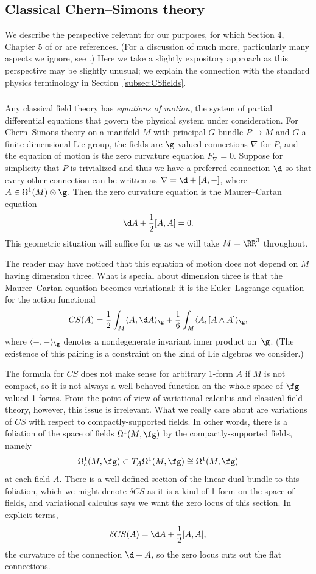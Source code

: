 \documentclass[10pt]{amsart}
\begin{document}
\subsection{Classical Chern--Simons theory}

We describe the perspective relevant for our purposes,
for which Section 4, Chapter 5 of \cite{CosBook} or \cite{CosCS} are references.
(For a discussion of much more, particularly many aspects we ignore, see \cite{FreCCS}.)
Here we take a slightly expository approach as this perspective may be slightly unusual;
we explain the connection with the standard physics terminology in Section~\ref{subsec:CSfields}.

\subsubsection{}

Any classical field theory has {\em equations of motion}, 
the system of partial differential equations that govern the physical system under consideration.
For Chern--Simons theory on a manifold $M$ with principal $G$-bundle $P \to M$ 
and $G$ a finite-dimensional Lie group,
the fields are $\g$-valued connections $\nabla$ for $P$,
and the equation of motion is the zero curvature equation $F_\nabla = 0$.
Suppose for simplicity that $P$ is trivialized 
and thus we have a preferred connection $\d$
so that every other connection can be written as $\nabla = \d + [A, -]$,
where $A \in \Omega^1(M) \otimes \g$.
Then the zero curvature equation is the Maurer--Cartan equation 
\[
\d A + \frac{1}{2} [A,A] = 0.
\]
This geometric situation will suffice for us as we will take $M = \RR^3$ throughout.

The reader may have noticed that this equation of motion does not depend on $M$ having dimension three.
What is special about dimension three is that the Maurer--Cartan equation becomes variational:
it is the  Euler--Lagrange equation for the action functional
\[
CS(A) = \frac{1}{2} \int_M \langle A, \d A \rangle_\g + \frac{1}{6} \int_M \langle A, [A \wedge A] \rangle_\g,
\]
where $\langle-,-\rangle_\g$ denotes a nondegenerate invariant inner product on~$\g$.
(The existence of this pairing is a constraint on the kind of Lie algebras we consider.)

The formula for $CS$ does not make sense for arbitrary 1-form $A$ if $M$ is not compact, 
so it is not always a well-behaved function on the whole space of $\fg$-valued 1-forms.
From the point of view of variational calculus and classical field theory, however, this issue is irrelevant.
What we really care about are variations of $CS$ with respect to compactly-supported fields.
In other words, there is a foliation of the space of fields $\Omega^1(M,\fg)$ by the compactly-supported fields,
namely 
\[
\Omega^1_c(M,\fg) \subset T_{A} \Omega^1(M,\fg) \cong \Omega^1(M,\fg)
\]
at each field $A$. 
There is a well-defined section of the linear dual bundle to this foliation, 
which we might denote $\delta CS$ as it is a kind of 1-form on the space of fields,
and variational calculus says we want the zero locus of this section.
In explicit terms, 
\[
\delta CS(A) = \d A + \frac{1}{2} [A,A], 
\]
the curvature of the connection $\d + A$,
so the zero locus cuts out the flat connections.
\end{document}
